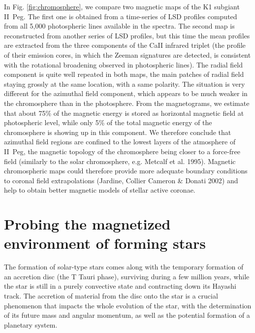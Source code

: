 \documentclass[11pt,twoside]{article}
\begin{document}
In Fig. \ref{fig:chromosphere}, we compare two magnetic maps of the K1 subgiant II~Peg. The first one is obtained from a time-series of LSD profiles computed from all 5,000 photospheric lines available in the spectra. The second map is reconstructed from another series of LSD profiles, but this time the mean profiles are extracted from the three components of the CaII infrared triplet (the profile of their emission cores, in which the Zeeman signatures are detected, is consistent with the rotational broadening observed in photospheric lines). The radial field component is quite well repeated in both maps, the main patches of radial field staying grossly at the same location, with a same polarity. The situation is very different for the azimuthal field component, which appears to be much weaker in the chromosphere than in the photosphere. From the magnetograms, we estimate that about 75\% of the magnetic energy is stored as horizontal magnetic field at photospheric level, while only 5\% of the total magnetic energy of the chromosphere is showing up in this component. We therefore conclude that azimuthal field regions are confined to the lowest layers of the atmosphere of II~Peg, the magnetic topology of the chromosphere being closer to a force-free field (similarly to the solar chromosphere, e.g. Metcalf et al. 1995). Magnetic chromospheric maps could therefore provide more adequate boundary conditions to coronal field extrapolations (Jardine, Collier Cameron \& Donati 2002) and help to obtain better magnetic models of stellar active coronae.

\section{Probing the magnetized environment of forming stars}

The formation of solar-type stars comes along with the temporary formation of an accretion disc (the T Tauri phase), surviving during a few million years, while the star is still in a purely convective state and contracting down its Hayashi track. The accretion of material from the disc onto the star is a crucial phenomenon that impacts the whole evolution of the star, with the determination of its future mass and angular momentum, as well as the potential formation of a planetary system. 
\end{document}
